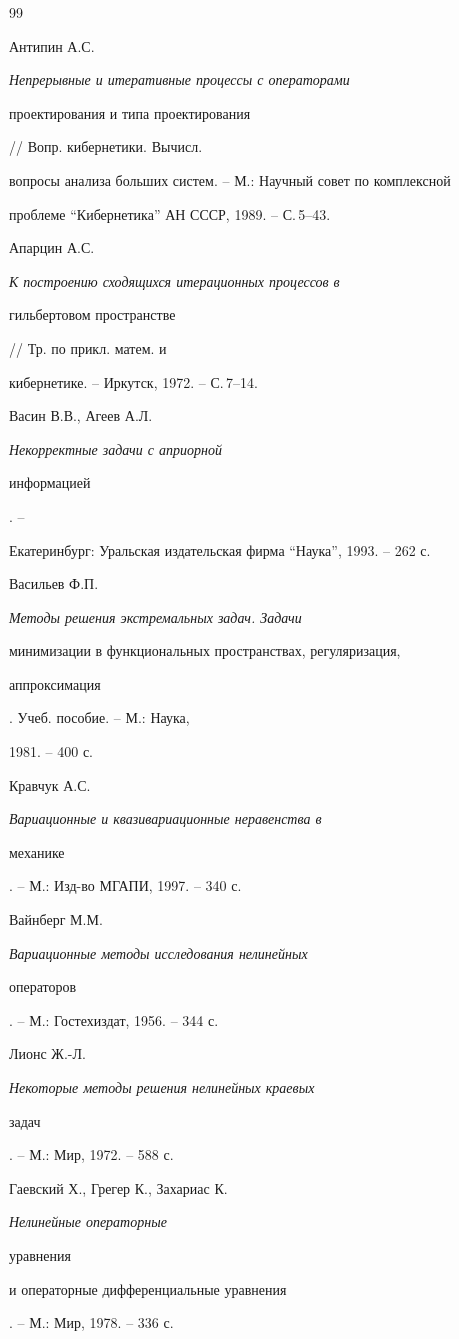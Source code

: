 \begin{thebibliography}{99}


Антипин А.С. {\em Непрерывные и итеративные процессы с операторами


проектирования и типа проектирования} // Вопр. кибернетики. Вычисл.


вопросы анализа больших систем. -- М.: Научный совет по комплексной


проблеме  ``Кибернетика'' АН СССР, 1989. -- С.\,5--43.




Апарцин А.С. {\em К построению сходящихся итерационных процессов в


гильбертовом пространстве} // Тр. по прикл. матем. и


кибернетике. -- Иркутск, 1972. -- С.\,7--14.




Васин В.В., Агеев А.Л. {\em Некорректные задачи с априорной


информацией}. --


 Екатеринбург: Уральская издательская фирма ``Наука'', 1993. -- 262 с.




Васильев Ф.П. {\em Методы решения экстремальных задач. Задачи


минимизации в функциональных пространствах, регуляризация,


аппроксимация}. Учеб. пособие. -- М.: Наука,


1981. --  400 с.




Кравчук А.С. {\em Вариационные и квазивариационные неравенства в


механике}. --  М.: Изд-во МГАПИ, 1997. -- 340 с.




Вайнберг М.М. {\em Вариационные методы исследования нелинейных


операторов}. -- М.: Гос\-тех\-издат, 1956. -- 344 с.




Лионс Ж.-Л. {\em Некоторые методы решения нелинейных краевых


задач}. -- М.:  Мир, 1972. -- 588 с.




Гаевский Х., Грегер К., Захариас К. {\em Нелинейные операторные


уравнения


 и операторные дифференциальные уравнения}. -- М.: Мир, 1978. -- 336 с.



\end{thebibliography}
